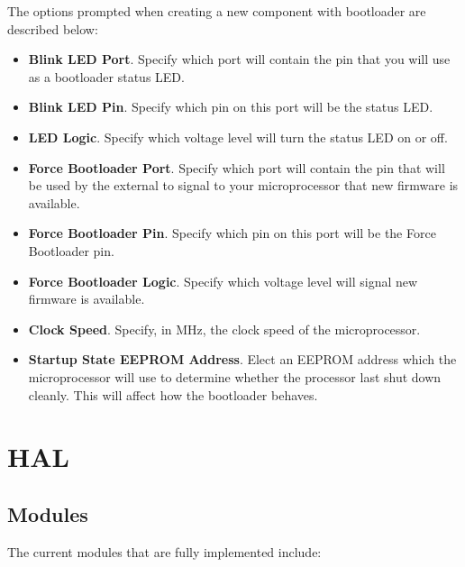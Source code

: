 \documentclass[a4paper, oneside, 11pt, titlepage, onecolumn, openright]{article}
\begin{document}
The options prompted when creating a new component with bootloader are described below:
\begin{itemize}

\item \textbf{Blink LED Port}. Specify which port will contain the pin that you will use as a bootloader status LED.

\item \textbf{Blink LED Pin}. Specify which pin on this port will be the status LED.

\item \textbf{LED Logic}. Specify which voltage level will turn the status LED on or off.

\item \textbf{Force Bootloader Port}. Specify which port will contain the pin that will be used by the external to signal to your microprocessor that new firmware is available.

\item \textbf{Force Bootloader Pin}. Specify which pin on this port will be the Force Bootloader pin.


\item \textbf{Force Bootloader Logic}. Specify which voltage level will signal new firmware is available.

\item \textbf{Clock Speed}. Specify, in MHz, the clock speed of the microprocessor.

\item \textbf{Startup State EEPROM Address}. Elect an EEPROM address which the microprocessor will use to determine whether the processor last shut down cleanly. This will affect how the bootloader behaves.

\end{itemize}

\section{HAL}
			\label{s:HAL}
			
\subsection{Modules}
			\label{ss:HALModules}
			The current modules that are fully implemented include:
			
\end{document}
